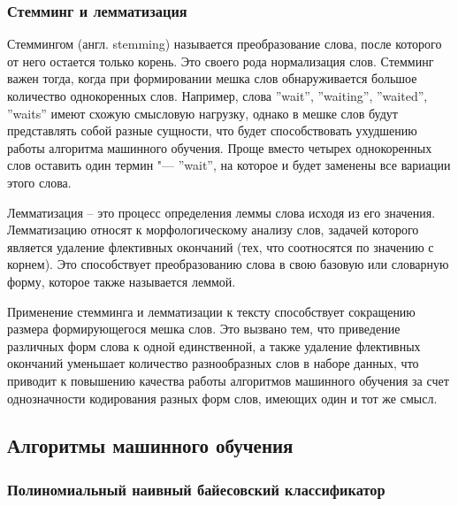 \documentclass[bachelor, och, coursework]{SCWorks}
\begin{document}
        \subsubsection{Стемминг и лемматизация}
            Стеммингом (англ. stemming) называется преобразование слова, после
            которого от него остается только корень. Это своего рода
            нормализация слов. Стемминг важен тогда, когда при формировании
            мешка слов обнаруживается большое количество однокоренных слов.
            Например, слова ''wait'', ''waiting'', ''waited'', ''waits'' имеют
            схожую смысловую нагрузку, однако в мешке слов будут представлять
            собой разные сущности, что будет способствовать ухудшению работы
            алгоритма машинного обучения. Проще вместо четырех однокоренных слов
            оставить один термин "--- ''wait'', на которое и будет заменены все
            вариации этого слова.

            Лемматизация – это процесс определения леммы слова исходя из его
            значения. Лемматизацию относят к морфологическому анализу слов,
            задачей которого является удаление флективных окончаний (тех, что
            соотносятся по значению с корнем). Это способствует преобразованию
            слова в свою базовую или словарную форму, которое также называется
            леммой.

            Применение стемминга и лемматизации к тексту способствует сокращению
            размера формирующегося мешка слов. Это вызвано тем, что приведение
            различных форм слова к одной единственной, а также удаление
            флективных окончаний уменьшает количество разнообразных слов в
            наборе данных, что приводит к повышению качества работы алгоритмов
            машинного обучения за счет однозначности кодирования разных форм
            слов, имеющих один и тот же смысл.
            

    \subsection{Алгоритмы машинного обучения}
        \subsubsection{Полиномиальный наивный байесовский классификатор}
            
\end{document}
